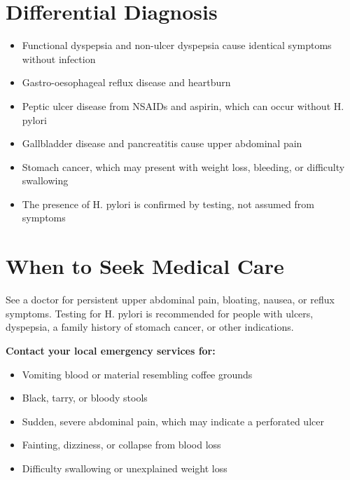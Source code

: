 \section*{Differential Diagnosis}
\begin{itemize}
    \item Functional dyspepsia and non-ulcer dyspepsia cause identical symptoms without infection
    \item Gastro-oesophageal reflux disease and heartburn
    \item Peptic ulcer disease from NSAIDs and aspirin, which can occur without H. pylori
    \item Gallbladder disease and pancreatitis cause upper abdominal pain
    \item Stomach cancer, which may present with weight loss, bleeding, or difficulty swallowing
    \item The presence of H. pylori is confirmed by testing, not assumed from symptoms
\end{itemize}

\section*{When to Seek Medical Care}
See a doctor for persistent upper abdominal pain, bloating, nausea, or reflux symptoms. Testing for H. pylori is recommended for people with ulcers, dyspepsia, a family history of stomach cancer, or other indications.

\textbf{Contact your local emergency services for:}
\begin{itemize}
    \item Vomiting blood or material resembling coffee grounds
    \item Black, tarry, or bloody stools
    \item Sudden, severe abdominal pain, which may indicate a perforated ulcer
    \item Fainting, dizziness, or collapse from blood loss
    \item Difficulty swallowing or unexplained weight loss
\end{itemize}

